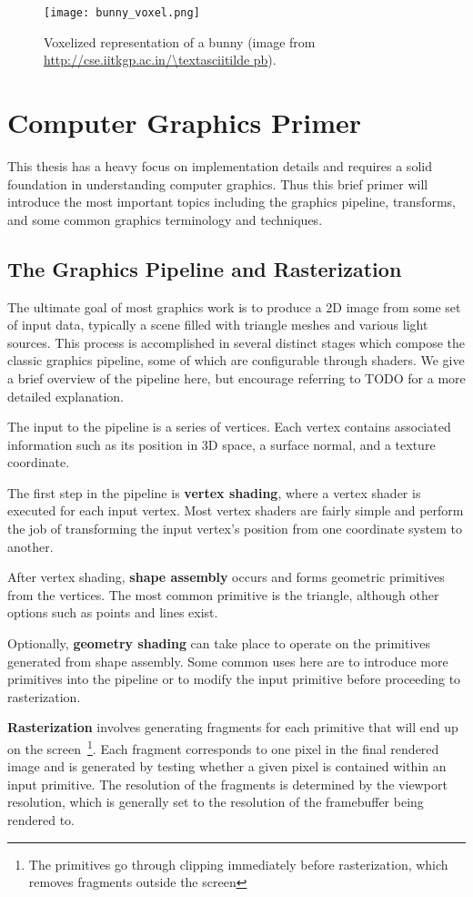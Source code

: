 \begin{figure}[h]
\centering
\texttt{[image: bunny\_voxel.png]}
\caption{Voxelized representation of a bunny (image from \url{http://cse.iitkgp.ac.in/\textasciitilde pb}).}
\label{fig:bunnyvoxel}
\end{figure}

\section{Computer Graphics Primer}
This thesis has a heavy focus on implementation details and requires a solid foundation in understanding computer graphics. Thus this brief primer will introduce the most important topics including the graphics pipeline, transforms, and some common graphics terminology and techniques.

\subsection{The Graphics Pipeline and Rasterization}
The ultimate goal of most graphics work is to produce a 2D image from some set of input data, typically a scene filled with triangle meshes and various light sources. This process is accomplished in several distinct stages which compose the classic graphics pipeline, some of which are configurable through shaders. We give a brief overview of the pipeline here, but encourage referring to TODO for a more detailed explanation.

The input to the pipeline is a series of vertices. Each vertex contains associated information such as its position in 3D space, a surface normal, and a texture coordinate.

The first step in the pipeline is \textbf{vertex shading}, where a vertex shader is executed for each input vertex. Most vertex shaders are fairly simple and perform the job of transforming the input vertex's position from one coordinate system to another.

After vertex shading, \textbf{shape assembly} occurs and forms geometric primitives from the vertices. The most common primitive is the triangle, although other options such as points and lines exist.

Optionally, \textbf{geometry shading} can take place to operate on the primitives generated from shape assembly. Some common uses here are to introduce more primitives into the pipeline or to modify the input primitive before proceeding to rasterization.

\textbf{Rasterization} involves generating fragments for each primitive that will end up on the screen~\footnote{The primitives go through clipping immediately before rasterization, which removes fragments outside the screen}. Each fragment corresponds to one pixel in the final rendered image and is generated by testing whether a given pixel is contained within an input primitive. The resolution of the fragments is determined by the viewport resolution, which is generally set to the resolution of the framebuffer being rendered to.

